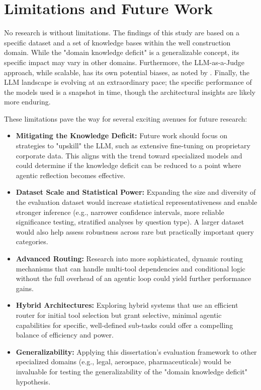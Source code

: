 \section{Limitations and Future Work}
\label{sec:conclusion_future_work}

    No research is without limitations. The findings of this study are based on a specific dataset and a set of knowledge bases within the well construction domain. While the "domain knowledge deficit" is a generalizable concept, its specific impact may vary in other domains. Furthermore, the LLM-as-a-Judge approach, while scalable, has its own potential biases, as noted by \citet{Gu2025}. Finally, the LLM landscape is evolving at an extraordinary pace; the specific performance of the models used is a snapshot in time, though the architectural insights are likely more enduring.

    These limitations pave the way for several exciting avenues for future research:

    \begin{itemize}
        \item \textbf{Mitigating the Knowledge Deficit:} Future work should focus on strategies to "upskill" the LLM, such as extensive fine-tuning on proprietary corporate data. This aligns with the trend toward specialized models \citep{Shah2024, Meena2023, Ghosh2023} and could determine if the knowledge deficit can be reduced to a point where agentic reflection becomes effective.
        \item \textbf{Dataset Scale and Statistical Power:} Expanding the size and diversity of the evaluation dataset would increase statistical representativeness and enable stronger inference (e.g., narrower confidence intervals, more reliable significance testing, stratified analyses by question type). A larger dataset would also help assess robustness across rare but practically important query categories.
        \item \textbf{Advanced Routing:} Research into more sophisticated, dynamic routing mechanisms that can handle multi-tool dependencies and conditional logic without the full overhead of an agentic loop could yield further performance gains.
        \item \textbf{Hybrid Architectures:} Exploring hybrid systems that use an efficient router for initial tool selection but grant selective, minimal agentic capabilities for specific, well-defined sub-tasks could offer a compelling balance of efficiency and power.
        \item \textbf{Generalizability:} Applying this dissertation's evaluation framework to other specialized domains (e.g., legal, aerospace, pharmaceuticals) would be invaluable for testing the generalizability of the "domain knowledge deficit" hypothesis.
    \end{itemize}

